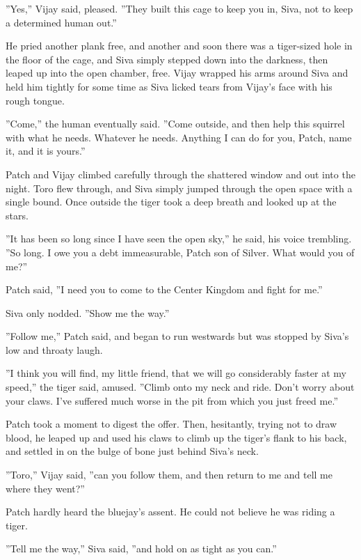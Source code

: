 \documentclass[11pt]{article}
\begin{document}
 ''Yes,'' Vijay said, pleased. ''They built this cage to keep you in, Siva, not to keep a determined human out.''\par
 He pried another plank free, and another %
 and soon there was a tiger-sized hole in the floor of the cage, and Siva simply stepped down into the darkness, then leaped up into the open chamber, free. Vijay wrapped his arms around Siva and held him tightly for some time as Siva licked tears from Vijay's face with his rough tongue.\par
 ''Come,'' the human eventually said. ''Come outside, and then help this squirrel with what he needs. Whatever he needs. Anything I can do for you, Patch, name it, and it is yours.''\par
 Patch and Vijay climbed carefully through the shattered window and out into the night. Toro flew through, and Siva simply jumped through the open space with a single bound. Once outside the tiger took a deep breath and looked up at the stars.\par
 ''It has been so long since I have seen the open sky,'' he said, his voice trembling. ''So long. I owe you a debt immeasurable, Patch son of Silver. What would you of me?''\par
 Patch said, ''I need you to come to the Center Kingdom and fight for me.''\par
 Siva only nodded. ''Show me the way.''\par
 ''Follow me,'' Patch said, and began to run westwards %
 but was stopped by Siva's low and throaty laugh.\par
 ''I think you will find, my little friend, that we will go considerably faster at my speed,'' the tiger said, amused. ''Climb onto my neck and ride. Don't worry about your claws. I've suffered much worse in the pit from which you just freed me.''\par
 Patch took a moment to digest the offer. Then, hesitantly, trying not to draw blood, he leaped up and used his claws to climb up the tiger's flank to his back, and settled in on the bulge of bone just behind Siva's neck.\par
 ''Toro,'' Vijay said, ''can you follow them, and then return to me and tell me where they went?''\par
 Patch hardly heard the bluejay's assent. He could not believe he was riding a tiger.\par
 ''Tell me the way,'' Siva said, ''and hold on as tight as you can.''\par
\par
\end{document}
